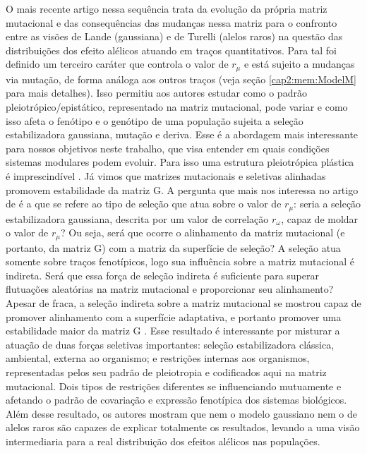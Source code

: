 O mais recente artigo nessa sequência \citep{Jones2007} trata da
evolução da própria matriz mutacional e das consequências das mudanças
nessa matriz para o confronto entre as visões de Lande (gaussiana) e de
Turelli (alelos raros) na questão das distribuições dos efeito alélicos
atuando em traços quantitativos. 
Para tal foi definido um terceiro caráter que controla o valor de
$r_\mu$ e está sujeito a mudanças via mutação, de forma análoga aos
outros traços (veja seção \ref{cap2:mem:ModelM} para mais detalhes). 
Isso permitiu aos autores estudar como o padrão pleiotrópico/epistático,
representado na matriz mutacional, pode variar e como isso afeta o
fenótipo e o genótipo de uma população sujeita a seleção estabilizadora
gaussiana, mutação e deriva. 
Esse é a abordagem mais interessante para nossos objetivos neste
trabalho, que visa entender em quais condições sistemas modulares podem
evoluir. 
Para isso uma estrutura pleiotrópica plástica é imprescindível
\citep{Wagner1996, Pavlicev2011a}. 
Já vimos que matrizes mutacionais e seletivas alinhadas promovem
estabilidade da matriz G. 
A pergunta que mais nos interessa no artigo de \cite{Jones2007} é a que
se refere ao tipo de seleção que atua sobre o valor de $r_\mu$: seria a
seleção estabilizadora gaussiana, descrita por um valor de correlação
$r_\omega$, capaz de moldar o valor de $r_\mu$? 
Ou seja, será que ocorre o alinhamento da matriz mutacional (e portanto,
da matriz G)  com a matriz da superfície de seleção? 
A seleção atua somente sobre traços fenotípicos, logo sua influência
sobre a matriz mutacional é indireta. 
Será que essa força de seleção indireta é suficiente para superar
flutuações aleatórias na matriz mutacional e proporcionar seu
alinhamento? Apesar de fraca, a seleção indireta sobre a matriz
mutacional se mostrou capaz de promover alinhamento com a superfície
adaptativa, e portanto promover uma estabilidade maior da matriz G
\citep{Jones2007}. 
Esse resultado é interessante por misturar a atuação de duas forças
seletivas importantes: seleção estabilizadora clássica, ambiental,
externa ao organismo; e restrições internas aos organismos,
representadas pelos seu padrão de pleiotropia e codificados aqui na
matriz mutacional. 
Dois tipos de restrições diferentes se influenciando mutuamente e
afetando o padrão de covariação e expressão fenotípica dos sistemas
biológicos. 
Além desse resultado, os autores mostram que nem o modelo gaussiano nem
o de alelos raros são capazes de explicar totalmente os resultados,
levando a uma visão intermediaria para a real distribuição dos efeitos
alélicos nas populações. 

